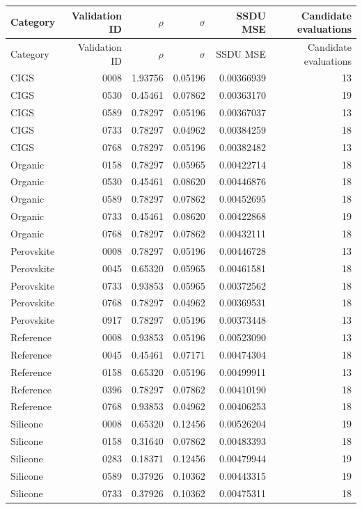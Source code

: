 \documentclass[10pt,a4paper]{article}
\begin{document}
\small
\begin{longtable}{@{}lrrrrr@{}}
\toprule
Category & Validation ID & $\rho$ & $\sigma$ &
SSDU MSE & Candidate evaluations\\
\midrule
\endfirsthead
\toprule
Category & Validation ID & $\rho$ & $\sigma$ &
SSDU MSE & Candidate evaluations\\
\midrule
\endhead
CIGS & 0008 & 1.93756 & 0.05196 & 0.00366939 & 13 \\
CIGS & 0530 & 0.45461 & 0.07862 & 0.00363170 & 19 \\
CIGS & 0589 & 0.78297 & 0.05196 & 0.00367037 & 13 \\
CIGS & 0733 & 0.78297 & 0.04962 & 0.00384259 & 18 \\
CIGS & 0768 & 0.78297 & 0.05196 & 0.00382482 & 13 \\
Organic & 0158 & 0.78297 & 0.05965 & 0.00422714 & 18 \\
Organic & 0530 & 0.45461 & 0.08620 & 0.00446876 & 18 \\
Organic & 0589 & 0.78297 & 0.07862 & 0.00452695 & 18 \\
Organic & 0733 & 0.45461 & 0.08620 & 0.00422868 & 19 \\
Organic & 0768 & 0.78297 & 0.07862 & 0.00432111 & 18 \\
Perovskite & 0008 & 0.78297 & 0.05196 & 0.00446728 & 13 \\
Perovskite & 0045 & 0.65320 & 0.05965 & 0.00461581 & 18 \\
Perovskite & 0733 & 0.93853 & 0.05965 & 0.00372562 & 18 \\
Perovskite & 0768 & 0.78297 & 0.04962 & 0.00369531 & 18 \\
Perovskite & 0917 & 0.78297 & 0.05196 & 0.00373448 & 13 \\
Reference & 0008 & 0.93853 & 0.05196 & 0.00523090 & 13 \\
Reference & 0045 & 0.45461 & 0.07171 & 0.00474304 & 18 \\
Reference & 0158 & 0.65320 & 0.05196 & 0.00499911 & 13 \\
Reference & 0396 & 0.78297 & 0.07862 & 0.00410190 & 18 \\
Reference & 0768 & 0.93853 & 0.04962 & 0.00406253 & 18 \\
Silicone & 0008 & 0.65320 & 0.12456 & 0.00526204 & 19 \\
Silicone & 0158 & 0.31640 & 0.07862 & 0.00483393 & 18 \\
Silicone & 0283 & 0.18371 & 0.12456 & 0.00479944 & 19 \\
Silicone & 0589 & 0.37926 & 0.10362 & 0.00443315 & 19 \\
Silicone & 0733 & 0.37926 & 0.10362 & 0.00475311 & 18 \\
\bottomrule
\end{longtable}
\normalsize
\end{document}
